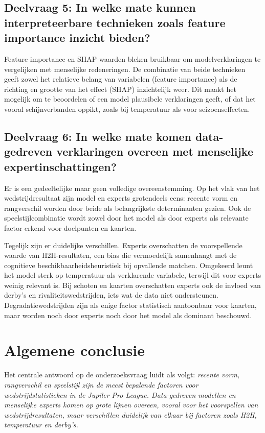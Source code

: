 \subsection*{Deelvraag 5: In welke mate kunnen interpreteerbare technieken zoals feature importance inzicht bieden?}

Feature importance en SHAP-waarden bleken bruikbaar om modelverklaringen te vergelijken met menselijke redeneringen.
De combinatie van beide technieken geeft zowel het relatieve belang van variabelen (feature importance)
als de richting en grootte van het effect (SHAP) inzichtelijk weer.
Dit maakt het mogelijk om te beoordelen of een model plausibele verklaringen geeft, of dat het vooral schijnverbanden oppikt,
zoals bij temperatuur als voor seizoenseffecten.

\subsection*{Deelvraag 6: In welke mate komen data-gedreven verklaringen overeen met menselijke expertinschattingen?}

Er is een gedeeltelijke maar geen volledige overeenstemming. Op het vlak van het wedstrijdresultaat
zijn model en experts grotendeels eens: recente vorm en rangverschil worden door beide als belangrijkste
determinanten gezien. Ook de speelstijlcombinatie wordt zowel door het model als door experts als relevante
factor erkend voor doelpunten en kaarten.

\vspace{5pt}

Tegelijk zijn er duidelijke verschillen. Experts overschatten de voorspellende waarde van H2H-resultaten,
een bias die vermoedelijk samenhangt met de cognitieve beschikbaarheidsheuristiek bij opvallende matchen.
Omgekeerd leunt het model sterk op temperatuur als verklarende variabele, terwijl dit voor experts weinig relevant is.
Bij schoten en kaarten overschatten experts ook de invloed van derby's en rivaliteitswedstrijden,
iets wat de data niet ondersteunen. Degradatiewedstrijden zijn als enige factor statistisch aantoonbaar
voor kaarten, maar worden noch door experts noch door het model als dominant beschouwd.

\section{Algemene conclusie}

Het centrale antwoord op de onderzoeksvraag luidt als volgt: \textit{recente vorm, rangverschil en speelstijl zijn de meest bepalende factoren voor wedstrijdstatistieken in de Jupiler Pro League. Data-gedreven modellen en menselijke experts komen op grote lijnen overeen, vooral voor het voorspellen van wedstrijdresultaten, maar verschillen duidelijk van elkaar bij factoren zoals H2H, temperatuur en derby’s.}

